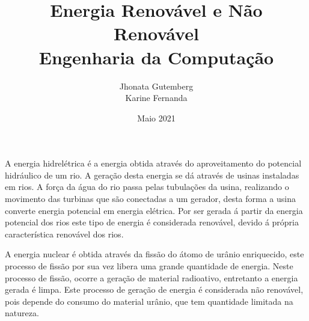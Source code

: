 \documentclass[a4paper, 12pt]{article}
\title{
    Energia Renovável e Não Renovável \\
    \large Engenharia da Computação
}
\author{
    Jhonata Gutemberg \\
    Karine Fernanda
}
\date{Maio 2021}
\begin{document}
    \maketitle
    \par A energia hidrelétrica é a energia obtida através do aproveitamento do potencial hidráulico de um rio. A geração desta energia se dá através de usinas instaladas em rios. A força da água do rio passa pelas tubulações da usina, realizando o movimento das turbinas que são conectadas a um gerador, desta forma a usina converte energia potencial em energia elétrica. Por ser gerada á partir da energia potencial dos rios este tipo de energia é considerada renovável, devido á própria característica renovável dos rios.

    \par A energia nuclear é obtida através da fissão do átomo de urânio enriquecido, este processo de fissão por sua vez libera uma grande quantidade de energia. Neste processo de fissão, ocorre a geração de material radioativo, entretanto a energia gerada é limpa. Este processo de geração de energia é considerada não renovável, pois depende do consumo do material urânio, que tem quantidade limitada na natureza.
\end{document}
